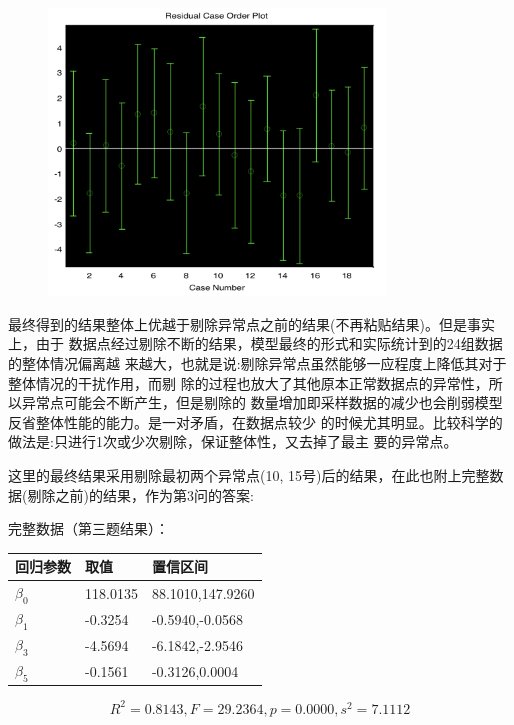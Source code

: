 \documentclass{article}
\begin{document}
\begin{figure}[H]
    \centering
    \includegraphics[width=0.8\textwidth]{pic10.png}
\end{figure}

最终得到的结果整体上优越于剔除异常点之前的结果(不再粘贴结果)。但是事实上，由于 数据点经过剔除不断的结果，模型最终的形式和实际统计到的24组数据的整体情况偏离越
来越大，也就是说:剔除异常点虽然能够一应程度上降低其对于整体情况的干扰作用，而剔 除的过程也放大了其他原本正常数据点的异常性，所以异常点可能会不断产生，但是剔除的 数量增加即采样数据的减少也会削弱模型反省整体性能的能力。是一对矛盾，在数据点较少 的时候尤其明显。比较科学的做法是:只进行1次或少次剔除，保证整体性，又去掉了最主 要的异常点。


这里的最终结果采用剔除最初两个异常点(10, 15号)后的结果，在此也附上完整数 据(剔除之前)的结果，作为第3问的答案:

完整数据（第三题结果）：
\begin{table}[H]
\centering
\begin{tabular}{|l|l|l|}
\hline
回归参数 & 取值       & 置信区间             \\ \hline
$\beta_0$     & 118.0135 & 88.1010,147.9260 \\ \hline
$\beta_1$     & -0.3254  & -0.5940,-0.0568  \\ \hline
$\beta_3$     & -4.5694  & -6.1842,-2.9546  \\ \hline
$\beta_5$     & -0.1561  & -0.3126,0.0004   \\ \hline
\end{tabular}
\end{table}

$$R^2=0.8143,F=29.2364,p=0.0000,s^2=7.1112$$
\end{document}
